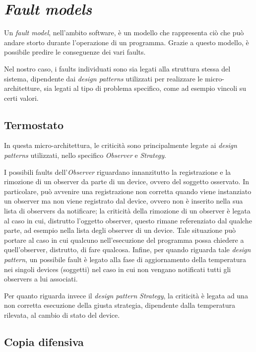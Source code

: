 \chapter{\emph{Fault models}}

Un \emph{fault model}, nell'ambito software, è un modello che rappresenta ciò che può andare storto durante l'operazione di un programma. Grazie a questo modello, è possibile predire le conseguenze dei vari faults.

Nel nostro caso, i faults individuati sono sia legati alla struttura stessa del sistema, dipendente dai \emph{design patterns} utilizzati per realizzare le micro-architetture, sia legati al tipo di problema specifico, come ad esempio vincoli su certi valori.

\section{Termostato}

In questa micro-architettura, le criticità sono principalmente legate ai \emph{design patterns} utilizzati, nello specifico \emph{Observer} e \emph{Strategy}.

I possibili faults dell'\emph{Observer} riguardano innanzitutto la registrazione e la rimozione di un observer da parte di un device, ovvero del soggetto osservato. In particolare, può avvenire una registrazione non corretta quando viene instanziato un observer ma non viene registrato dal device, ovvero non è inserito nella sua lista di observers da notificare; la criticità della rimozione di un observer è legata al caso in cui, distrutto l'oggetto observer, questo rimane referenziato dal qualche parte, ad esempio nella lista degli observer di un device. Tale situazione può portare al caso in cui qualcuno nell'esecuzione del programma possa chiedere a quell'observer, distrutto, di fare qualcosa.
Infine, per quando riguarda tale \emph{design pattern}, un possibile fault è legato alla fase di aggiornamento della temperatura nei singoli devices (soggetti) nel caso in cui non vengano notificati tutti gli observers a lui associati.

Per quanto riguarda invece il \emph{design pattern} \emph{Strategy}, la criticità è legata ad una non corretta esecuzione della giusta strategia, dipendente dalla temperatura rilevata, al cambio di stato del device.


\section{Copia difensiva}

